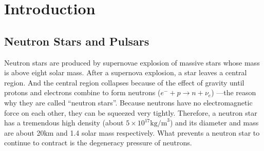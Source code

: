 \documentclass[a4paper, 12pt]{report}
\begin{document}


\tableofcontents

\cleardoublepage
{}
{}
\listoffigures

\cleardoublepage
{}
{}
\listoftables



 
\cleardoublepage
\newpage
\listoftables


\chapter{Introduction}   	   
  \section{Neutron Stars and Pulsars}
    Neutron stars are produced by supernovae explosion of massive stars whose mass 
    is above eight solar mass. After a supernova explosion, a star leaves a central region. 
    And the central region collapses because of the effect of 
    gravity until protons and electrons combine to form neutrons 
    ($e^{-}+p\rightarrow n+\nu_{e}$) ---the reason why they are called ``neutron stars''.  
    Because neutrons have no electromagnetic force on each other, they can be squeezed very 
    tightly. Therefore, a neutron star has a tremendous high density 
    (about $5\times 10^{17} \mbox{kg/m}^3$) and its diameter and mass are about 20km and 
    1.4 solar mass respectively. What
    prevents a neutron star to continue to contract is the degeneracy pressure of neutrons. 
    
\end{document}
